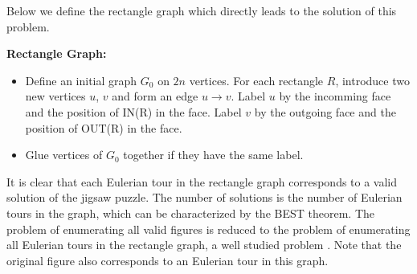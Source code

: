 \documentclass[a4paper]{article}
\begin{document}
Below we define the rectangle graph which directly leads to the solution of this problem.

\textbf{Rectangle Graph:}
\begin{itemize}
\item  Define an initial graph $G_0$ on $2n$ vertices. For each rectangle $R$, introduce two new vertices $u$, $v$ and form an edge $u \rightarrow v$.
Label $u$ by the incomming face and the position of IN(R) in the face.
Label $v$ by the outgoing face and the position of OUT(R) 
in the face.
\item Glue vertices of $G_0$ together if they have the same label.
\end{itemize}

It is clear that each Eulerian tour in the rectangle graph corresponds to a valid solution of the jigsaw puzzle. The number of solutions is the number of
Eulerian tours in the graph, which can be characterized by the BEST \cite{best} theorem. The problem of enumerating all valid figures is reduced to the problem of enumerating
all Eulerian tours in the rectangle graph, a well studied problem \cite{abrham80}. 
Note that the original figure also corresponds to an Eulerian tour in this graph.  

\end{document}
